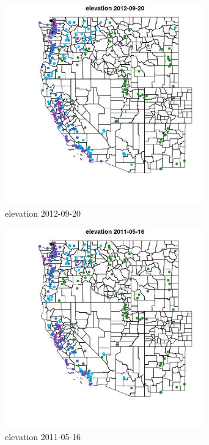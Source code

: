 \begin{figure} 
\centering  
\includegraphics[width=0.77\textwidth]{Code_Outputs/ML_input_report_ML_input_PM25_Step5_part_d_de_duplicated_aves_ML_input_MapObselevation2012-09-20.jpg} 
\caption{\label{fig:ML_input_report_ML_input_PM25_Step5_part_d_de_duplicated_aves_ML_inputMapObselevation2012-09-20}elevation 2012-09-20} 
\end{figure} 
 

\begin{figure} 
\centering  
\includegraphics[width=0.77\textwidth]{Code_Outputs/ML_input_report_ML_input_PM25_Step5_part_d_de_duplicated_aves_ML_input_MapObselevation2011-05-16.jpg} 
\caption{\label{fig:ML_input_report_ML_input_PM25_Step5_part_d_de_duplicated_aves_ML_inputMapObselevation2011-05-16}elevation 2011-05-16} 
\end{figure} 
 

